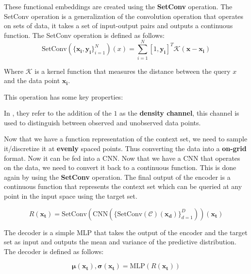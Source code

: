 \documentclass[../../main.tex]{subfiles}
\begin{document}
These functional embeddings are created using the \textbf{SetConv} operation. The SetConv operation is a generalization of the convolution operation that operates on sets of data, it takes a set of input-output pairs and outputs a continuous function. The SetConv operation is defined as follows:
\begin{equation}
	\text{SetConv}(\{\bm{x_i}, \bm{y_i}\}_{i=1}^{N})(x) = \sum_{i=1}^{N} [1, \bm{y_i}] ^ T \mathcal{K}(\bm{x} - \bm{x_i})
\end{equation}

Where $\mathcal{K}$ is a kernel function that measures the distance between the query $x$ and the data point $\bm{x_i}$.

This operation has some key properties:

In \cite{gordon2020convolutional}, they refer to the addition of the $1$ as the \textbf{density channel}, this channel is used to distinguish between observed and unobserved data points. 


Now that we have a function representation of the context set, we need to sample it/discretize it at \textbf{evenly} spaced points. Thus converting the data into a \textbf{on-grid} format. Now it can be fed into a CNN. Now that we have a CNN that operates on the data, we need to convert it back to a continuous function. This is done again by using the \textbf{SetConv} operation. The final output of the encoder is a continuous function that represents the context set which can be queried at any point in the input space using the target set.

\begin{equation}
	R(\bm{x_t}) = \text{SetConv}(\text{CNN}(\{\text{SetConv}(\mathcal{C})(\bm{x_d})\}_{d=1}^{D}))(\bm{x_t})
\end{equation}



The decoder is a simple MLP that takes the output of the encoder and the target set as input and outputs the mean and variance of the predictive distribution. The decoder is defined as follows:

\begin{equation}
	\bm{\mu}(\bm{x_t}), \bm{\sigma}(\bm{x_t}) = \text{MLP}(R(\bm{x_t}))
\end{equation}


\ifSubfilesClassLoaded{%
    \printbibliography{}
}{} 
\end{document}
